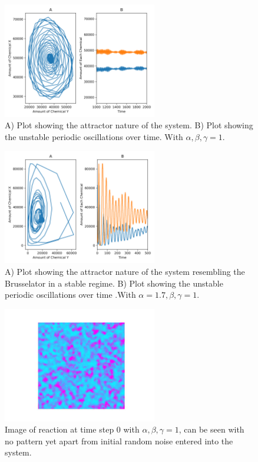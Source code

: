 \documentclass[12pt, A4]{article}
\begin{document}
\begin{figure}[b]
  \begin{center}
    \includegraphics[width=0.6\textwidth]{first_pic.png}
  \end{center}
  \caption{A) Plot showing the attractor nature of the system. B) Plot showing the unstable periodic oscillations over time. With $\alpha,\beta,\gamma =1$.}
  \label{fig:first}
\end{figure}

\begin{figure}[b]
  \begin{center}
    \includegraphics[width=0.6\textwidth]{organator.png}
  \end{center}
  \caption{A) Plot showing the attractor nature of the system resembling the Brusselator in a stable regime. B) Plot showing the unstable periodic oscillations over time .With $\alpha=1.7, \beta,\gamma =1$.}
  \label{fig:organatro}
\end{figure}

\begin{figure}[b]
  \begin{center}
    \includegraphics[width=0.6\textwidth]{frame_0.png}
  \end{center}
  \caption{Image of reaction at time step 0 with $\alpha,\beta,\gamma =1$, can be seen with no pattern yet apart from initial random noise entered into the system.}
  \label{fig:frame0}
\end{figure}
\end{document}
